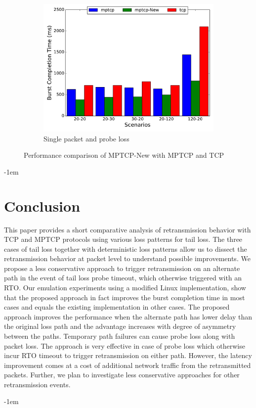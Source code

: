 \documentclass[10pt,conference,compsoc]{IEEEtran}
\begin{document}
\begin{figure}[!tbp]
\begin{subfigure}[b]{0.32\textwidth}
\includegraphics[angle=0, width=\textwidth, natwidth=578.16,natheight=433.62]{plots/1PPNew.pdf}
\caption{Single packet and probe loss}\label{1ppn}
\end{subfigure}
\caption{Performance comparison of MPTCP-New with MPTCP and TCP}
\end{figure}


\kern-1em
\section{Conclusion}\label{conc}
This paper provides a short comparative analysis of retransmission behavior with TCP and MPTCP protocols using various loss patterns for tail loss.
The three cases of tail loss together with deterministic loss patterns allow us to dissect the retransmission behavior at packet level to understand possible improvements.
We propose a less conservative approach to trigger retransmission on an alternate path in the event of tail loss probe timeout, which otherwise triggered with an RTO. 
Our emulation experiments  using a modified Linux implementation, show that the proposed approach in fact improves the burst completion time in most cases and equals the existing
implementation in other cases. The proposed approach improves the performance when the alternate path has lower delay than the original loss path and the advantage increases with degree of asymmetry between the paths. Temporary path failures can cause probe loss along with packet loss. The approach is very effective in case of probe loss which otherwise incur RTO timeout to trigger retransmission on either path. However, the latency improvement comes at a cost of additional network traffic from the retransmitted packets. Further, we plan to investigate less conservative approaches for other retransmission events.
   
\kern-1em


\end{document}
